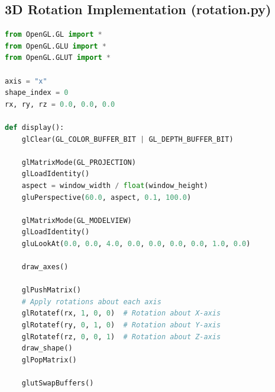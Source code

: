 \documentclass[12pt,a4paper]{article}
\begin{document}
\subsection{3D Rotation Implementation (rotation.py)}
\begin{lstlisting}[language=Python, caption=Dedicated 3D Rotation Implementation]
from OpenGL.GL import *
from OpenGL.GLU import *
from OpenGL.GLUT import *

axis = "x"
shape_index = 0
rx, ry, rz = 0.0, 0.0, 0.0

def display():
    glClear(GL_COLOR_BUFFER_BIT | GL_DEPTH_BUFFER_BIT)

    glMatrixMode(GL_PROJECTION)
    glLoadIdentity()
    aspect = window_width / float(window_height)
    gluPerspective(60.0, aspect, 0.1, 100.0)

    glMatrixMode(GL_MODELVIEW)
    glLoadIdentity()
    gluLookAt(0.0, 0.0, 4.0, 0.0, 0.0, 0.0, 0.0, 1.0, 0.0)

    draw_axes()

    glPushMatrix()
    # Apply rotations about each axis
    glRotatef(rx, 1, 0, 0)  # Rotation about X-axis
    glRotatef(ry, 0, 1, 0)  # Rotation about Y-axis
    glRotatef(rz, 0, 0, 1)  # Rotation about Z-axis
    draw_shape()
    glPopMatrix()

    glutSwapBuffers()
\end{lstlisting}
\end{document}

